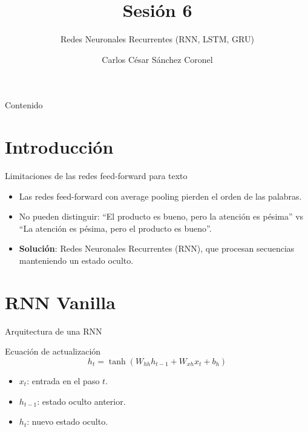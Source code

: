 \documentclass[aspectratio=169, 10pt, xcolor=table]{beamer}
\title[SESIÓN 6 NLP]{\textbf{Sesión 6}}
\subtitle{Redes Neuronales Recurrentes (RNN, LSTM, GRU)}
\author[Prof. C. Sánchez]{Carlos César Sánchez Coronel}
\institute{\textbf{NLP}}
\date{}
\begin{document}
\begin{frame}
    \titlepage
\end{frame}

\begin{frame}{Contenido}
    \tableofcontents
\end{frame}

\section{Introducción}

\begin{frame}{Limitaciones de las redes feed-forward para texto}
    \begin{itemize}
        \item Las redes feed-forward con average pooling pierden el orden de las palabras.
        \item No pueden distinguir: ``El producto es bueno, pero la atención es pésima'' vs ``La atención es pésima, pero el producto es bueno''.
        \item \textbf{Solución}: Redes Neuronales Recurrentes (RNN), que procesan secuencias manteniendo un estado oculto.
    \end{itemize}
\end{frame}

\section{RNN Vanilla}

\begin{frame}{Arquitectura de una RNN}
    \begin{block}{Ecuación de actualización}
        \[
        h_t = \tanh(W_{hh} h_{t-1} + W_{xh} x_t + b_h)
        \]
        \begin{itemize}
            \item $x_t$: entrada en el paso $t$.
            \item $h_{t-1}$: estado oculto anterior.
            \item $h_t$: nuevo estado oculto.
        \end{itemize}
    \end{block}
\end{frame}
\end{document}
